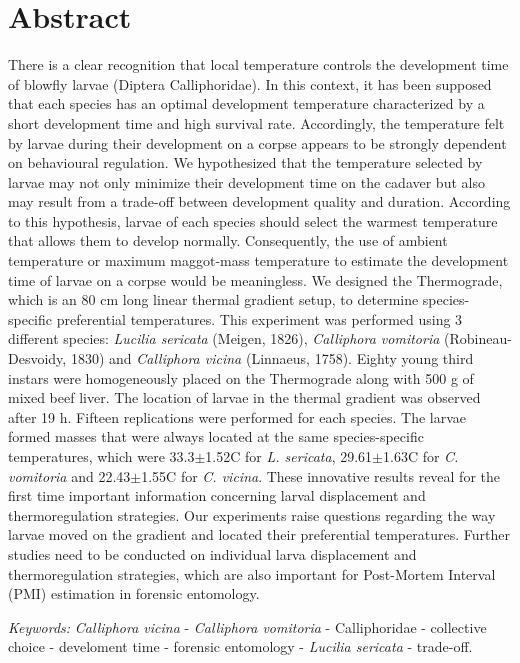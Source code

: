	\section{Abstract}
There is a clear recognition that local temperature controls the development time of blowfly larvae (Diptera Calliphoridae). In this context, it has been supposed that each species has an optimal development temperature characterized by a short development time and high survival rate. Accordingly, the temperature felt by larvae during their development on a corpse appears to be strongly dependent on behavioural regulation. We hypothesized that the temperature selected by larvae may not only minimize their development time on the cadaver but also may result from a trade-off between development quality and duration. According to this hypothesis, larvae of each species should select the warmest temperature that allows them to develop normally. Consequently, the use of ambient temperature or maximum maggot-mass temperature to estimate the development time of larvae on a corpse would be meaningless.
We designed the Thermograde, which is an 80 cm long linear thermal gradient setup, to determine species-specific preferential temperatures. This experiment was performed using 3 different species: \textit{Lucilia sericata} (Meigen, 1826), \textit{Calliphora vomitoria} (Robineau-Desvoidy, 1830) and \textit{Calliphora vicina} (Linnaeus, 1758). Eighty young third instars were homogeneously placed on the Thermograde along with 500 g of mixed beef liver. The location of larvae in the thermal gradient was observed after 19 h. Fifteen replications were performed for each species. The larvae formed masses that were always located at the same species-specific temperatures, which were 33.3$\pm$1.52C for \textit{L. sericata}, 29.61$\pm$1.63C for \textit{C. vomitoria} and 22.43$\pm$1.55C for \textit{C. vicina}. These innovative results reveal for the first time important information concerning larval displacement and thermoregulation strategies. Our experiments raise questions regarding the way larvae moved on the gradient and located their preferential temperatures. Further studies need to be conducted on individual larva displacement and thermoregulation strategies, which are also important for Post-Mortem Interval (PMI) estimation in forensic entomology. 

\textit{Keywords:} \textit{Calliphora vicina} - \textit{Calliphora vomitoria} - Calliphoridae - collective choice - develoment time - forensic entomology - \textit{Lucilia sericata} - trade-off.

